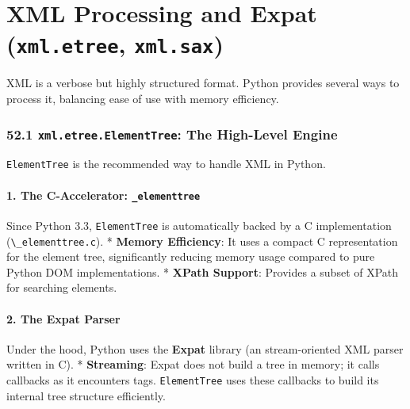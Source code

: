 \hypertarget{xml-processing-and-expat-xml.etree-xml.sax}{%
\chapter{\texorpdfstring{XML Processing and Expat (\texttt{xml.etree},
\texttt{xml.sax})}{XML Processing and Expat (xml.etree, xml.sax)}}\label{xml-processing-and-expat-xml.etree-xml.sax}}

XML is a verbose but highly structured format. Python provides several
ways to process it, balancing ease of use with memory efficiency.

\hypertarget{xml.etree.elementtree-the-high-level-engine}{%
\subsection{\texorpdfstring{52.1 \texttt{xml.etree.ElementTree}: The
High-Level
Engine}{52.1 xml.etree.ElementTree: The High-Level Engine}}\label{xml.etree.elementtree-the-high-level-engine}}

\passthrough{\lstinline!ElementTree!} is the recommended way to handle
XML in Python.

\hypertarget{the-c-accelerator-_elementtree}{%
\subsubsection{\texorpdfstring{1. The C-Accelerator:
\texttt{\_elementtree}}{1. The C-Accelerator: \_elementtree}}\label{the-c-accelerator-_elementtree}}

Since Python 3.3, \passthrough{\lstinline!ElementTree!} is automatically
backed by a C implementation
(\passthrough{\lstinline!\_elementtree.c!}). * \textbf{Memory
Efficiency}: It uses a compact C representation for the element tree,
significantly reducing memory usage compared to pure Python DOM
implementations. * \textbf{XPath Support}: Provides a subset of XPath
for searching elements.

\hypertarget{the-expat-parser}{%
\subsubsection{2. The Expat Parser}\label{the-expat-parser}}

Under the hood, Python uses the \textbf{Expat} library (an
stream-oriented XML parser written in C). * \textbf{Streaming}: Expat
does not build a tree in memory; it calls callbacks as it encounters
tags. \passthrough{\lstinline!ElementTree!} uses these callbacks to
build its internal tree structure efficiently.


